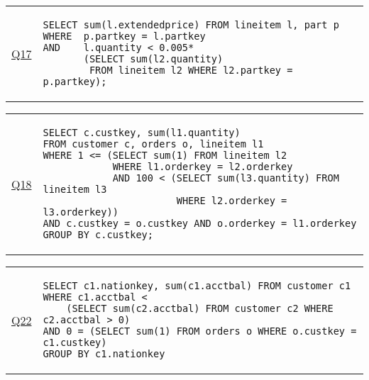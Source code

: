 \hspace{-5mm}\vspace{-8mm}
\begin{tabular}{lp{}}
\begin{rotate}{90}\hspace{-0.9cm}\underline{Q17}\end{rotate} &
{\scriptsize
\begin{verbatim}
SELECT sum(l.extendedprice) FROM lineitem l, part p
WHERE  p.partkey = l.partkey
AND    l.quantity < 0.005*
       (SELECT sum(l2.quantity)
        FROM lineitem l2 WHERE l2.partkey = p.partkey);
\end{verbatim}}
\end{tabular}

\hspace{-5mm}\vspace{-8mm}
\begin{tabular}{lp{}}
\begin{rotate}{90}\hspace{-0.9cm}\underline{Q18}\end{rotate} &
{\scriptsize
\begin{verbatim}
SELECT c.custkey, sum(l1.quantity)
FROM customer c, orders o, lineitem l1
WHERE 1 <= (SELECT sum(1) FROM lineitem l2
            WHERE l1.orderkey = l2.orderkey
            AND 100 < (SELECT sum(l3.quantity) FROM lineitem l3
                       WHERE l2.orderkey = l3.orderkey))
AND c.custkey = o.custkey AND o.orderkey = l1.orderkey
GROUP BY c.custkey;
\end{verbatim}}
\end{tabular}

\hspace{-5mm}\vspace{-8mm}
\begin{tabular}{lp{}}
\begin{rotate}{90}\hspace{-0.9cm}\underline{Q22}\end{rotate} &
{\scriptsize
\begin{verbatim}
SELECT c1.nationkey, sum(c1.acctbal) FROM customer c1
WHERE c1.acctbal <
    (SELECT sum(c2.acctbal) FROM customer c2 WHERE c2.acctbal > 0)
AND 0 = (SELECT sum(1) FROM orders o WHERE o.custkey = c1.custkey)
GROUP BY c1.nationkey
\end{verbatim}}
\end{tabular}


